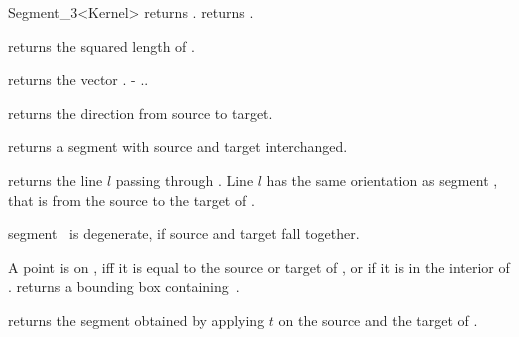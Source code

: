 \begin{ccRefClass} {Segment_3<Kernel>}
       {returns .}
\ccGlue
{}
       {returns .}

       {returns the squared length of \ccVar. }

       {returns the vector \ccVar. - \ccVar..}

       {returns the direction from source to target.}


       {returns a segment with source and target interchanged.}

       {returns the line $l$ passing through \ccVar. Line $l$  has the
        same orientation as segment \ccVar, that is 
        from the source to the target of \ccVar.}

       {segment \ccVar\ is degenerate, if source and target fall together.}


       {A point is on \ccVar, iff it is equal to the source or target
        of \ccVar, or if it is in the interior of \ccVar.}
% 
% 
       {returns a bounding box containing~\ccVar.}

       {returns the segment obtained by applying $t$ on the source
        and the target of \ccVar.}

\ccSeeAlso
{}\\

\end{ccRefClass} 
